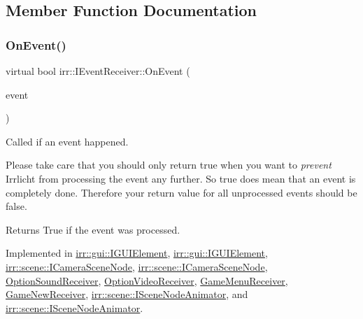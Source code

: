\subsection{Member Function Documentation}
\mbox{\label{classirr_1_1IEventReceiver_a571f744ceffc3b4fe8a81f529163eb97}} 
\subsubsection{\texorpdfstring{On\+Event()}{OnEvent()}\hspace{0.1cm}{\footnotesize\ttfamily [1/2]}}
{\footnotesize\ttfamily virtual bool irr\+::\+I\+Event\+Receiver\+::\+On\+Event (\begin{DoxyParamCaption}\item[{const \hyperlink{structirr_1_1SEvent}{S\+Event} \&}]{event }\end{DoxyParamCaption})\hspace{0.3cm}{\ttfamily [pure virtual]}}



Called if an event happened. 

Please take care that you should only return \textquotesingle{}true\textquotesingle{} when you want to {\itshape prevent} Irrlicht from processing the event any further. So \textquotesingle{}true\textquotesingle{} does mean that an event is completely done. Therefore your return value for all unprocessed events should be \textquotesingle{}false\textquotesingle{}. \begin{DoxyReturn}{Returns}
True if the event was processed. 
\end{DoxyReturn}


Implemented in \hyperlink{classirr_1_1gui_1_1IGUIElement_a54b1799e21722d9e6ce5b8e4bdb2e80a}{irr\+::gui\+::\+I\+G\+U\+I\+Element}, \hyperlink{classirr_1_1gui_1_1IGUIElement_a54b1799e21722d9e6ce5b8e4bdb2e80a}{irr\+::gui\+::\+I\+G\+U\+I\+Element}, \hyperlink{classirr_1_1scene_1_1ICameraSceneNode_af27145518f43a17f803cdea086f68f3c}{irr\+::scene\+::\+I\+Camera\+Scene\+Node}, \hyperlink{classirr_1_1scene_1_1ICameraSceneNode_af27145518f43a17f803cdea086f68f3c}{irr\+::scene\+::\+I\+Camera\+Scene\+Node}, \hyperlink{classOptionSoundReceiver_ae7c9643b12df38a45d4e3d629274019c}{Option\+Sound\+Receiver}, \hyperlink{classOptionVideoReceiver_a203025900c489eb2df12a6b3471c3caa}{Option\+Video\+Receiver}, \hyperlink{classGameMenuReceiver_af6774556abc7e3718b7bf904cc62ead0}{Game\+Menu\+Receiver}, \hyperlink{classGameNewReceiver_ad9ec097d8b46946ed1a21c24463fc0b6}{Game\+New\+Receiver}, \hyperlink{classirr_1_1scene_1_1ISceneNodeAnimator_aca20b841bb586cd9654464b001a7b6aa}{irr\+::scene\+::\+I\+Scene\+Node\+Animator}, and \hyperlink{classirr_1_1scene_1_1ISceneNodeAnimator_aca20b841bb586cd9654464b001a7b6aa}{irr\+::scene\+::\+I\+Scene\+Node\+Animator}.

